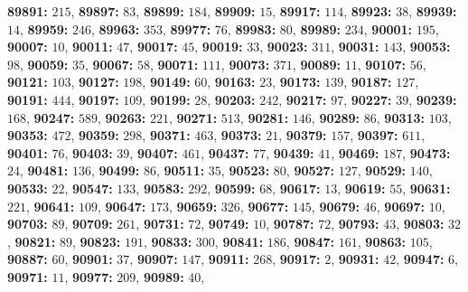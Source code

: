 \textsf{\bfseries 89891:} $215$, \textsf{\bfseries 89897:} $83$, \textsf{\bfseries 89899:} $184$, \textsf{\bfseries 89909:} $15$, \textsf{\bfseries 89917:} $114$, \textsf{\bfseries 89923:} $38$, \textsf{\bfseries 89939:} $14$, \textsf{\bfseries 89959:} $246$, \textsf{\bfseries 89963:} $353$, \textsf{\bfseries 89977:} $76$, \textsf{\bfseries 89983:} $80$, \textsf{\bfseries 89989:} $234$, \textsf{\bfseries 90001:} $195$, \textsf{\bfseries 90007:} $10$, \textsf{\bfseries 90011:} $47$, \textsf{\bfseries 90017:} $45$, \textsf{\bfseries 90019:} $33$, \textsf{\bfseries 90023:} $311$, \textsf{\bfseries 90031:} $143$, \textsf{\bfseries 90053:} $98$, \textsf{\bfseries 90059:} $35$, \textsf{\bfseries 90067:} $58$, \textsf{\bfseries 90071:} $111$, \textsf{\bfseries 90073:} $371$, \textsf{\bfseries 90089:} $11$, \textsf{\bfseries 90107:} $56$, \textsf{\bfseries 90121:} $103$, \textsf{\bfseries 90127:} $198$, \textsf{\bfseries 90149:} $60$, \textsf{\bfseries 90163:} $23$, \textsf{\bfseries 90173:} $139$, \textsf{\bfseries 90187:} $127$, \textsf{\bfseries 90191:} $444$, \textsf{\bfseries 90197:} $109$, \textsf{\bfseries 90199:} $28$, \textsf{\bfseries 90203:} $242$, \textsf{\bfseries 90217:} $97$, \textsf{\bfseries 90227:} $39$, \textsf{\bfseries 90239:} $168$, \textsf{\bfseries 90247:} $589$, \textsf{\bfseries 90263:} $221$, \textsf{\bfseries 90271:} $513$, \textsf{\bfseries 90281:} $146$, \textsf{\bfseries 90289:} $86$, \textsf{\bfseries 90313:} $103$, \textsf{\bfseries 90353:} $472$, \textsf{\bfseries 90359:} $298$, \textsf{\bfseries 90371:} $463$, \textsf{\bfseries 90373:} $21$, \textsf{\bfseries 90379:} $157$, \textsf{\bfseries 90397:} $611$, \textsf{\bfseries 90401:} $76$, \textsf{\bfseries 90403:} $39$, \textsf{\bfseries 90407:} $461$, \textsf{\bfseries 90437:} $77$, \textsf{\bfseries 90439:} $41$, \textsf{\bfseries 90469:} $187$, \textsf{\bfseries 90473:} $24$, \textsf{\bfseries 90481:} $136$, \textsf{\bfseries 90499:} $86$, \textsf{\bfseries 90511:} $35$, \textsf{\bfseries 90523:} $80$, \textsf{\bfseries 90527:} $127$, \textsf{\bfseries 90529:} $140$, \textsf{\bfseries 90533:} $22$, \textsf{\bfseries 90547:} $133$, \textsf{\bfseries 90583:} $292$, \textsf{\bfseries 90599:} $68$, \textsf{\bfseries 90617:} $13$, \textsf{\bfseries 90619:} $55$, \textsf{\bfseries 90631:} $221$, \textsf{\bfseries 90641:} $109$, \textsf{\bfseries 90647:} $173$, \textsf{\bfseries 90659:} $326$, \textsf{\bfseries 90677:} $145$, \textsf{\bfseries 90679:} $46$, \textsf{\bfseries 90697:} $10$, \textsf{\bfseries 90703:} $89$, \textsf{\bfseries 90709:} $261$, \textsf{\bfseries 90731:} $72$, \textsf{\bfseries 90749:} $10$, \textsf{\bfseries 90787:} $72$, \textsf{\bfseries 90793:} $43$, \textsf{\bfseries 90803:} $32$, \textsf{\bfseries 90821:} $89$, \textsf{\bfseries 90823:} $191$, \textsf{\bfseries 90833:} $300$, \textsf{\bfseries 90841:} $186$, \textsf{\bfseries 90847:} $161$, \textsf{\bfseries 90863:} $105$, \textsf{\bfseries 90887:} $60$, \textsf{\bfseries 90901:} $37$, \textsf{\bfseries 90907:} $147$, \textsf{\bfseries 90911:} $268$, \textsf{\bfseries 90917:} $2$, \textsf{\bfseries 90931:} $42$, \textsf{\bfseries 90947:} $6$, \textsf{\bfseries 90971:} $11$, \textsf{\bfseries 90977:} $209$, \textsf{\bfseries 90989:} $40$, 
